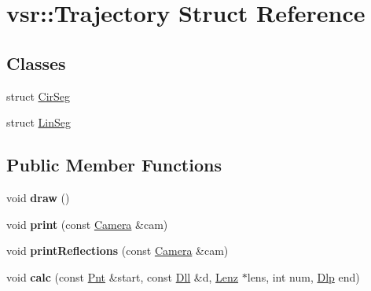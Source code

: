 \hypertarget{structvsr_1_1_trajectory}{\section{vsr\-:\-:Trajectory Struct Reference}
\label{structvsr_1_1_trajectory}
}
\subsection*{Classes}
\begin{DoxyCompactItemize}
\item 
struct \hyperlink{structvsr_1_1_trajectory_1_1_cir_seg}{Cir\-Seg}
\item 
struct \hyperlink{structvsr_1_1_trajectory_1_1_lin_seg}{Lin\-Seg}
\end{DoxyCompactItemize}
\subsection*{Public Member Functions}
\begin{DoxyCompactItemize}
\item 
\hypertarget{structvsr_1_1_trajectory_affe08065ef04802c2c675865188f8966}{void {\bfseries draw} ()}\label{structvsr_1_1_trajectory_affe08065ef04802c2c675865188f8966}

\item 
\hypertarget{structvsr_1_1_trajectory_aaa199c23f42797dd054612ab6236f297}{void {\bfseries print} (const \hyperlink{classvsr_1_1_camera}{Camera} \&cam)}\label{structvsr_1_1_trajectory_aaa199c23f42797dd054612ab6236f297}

\item 
\hypertarget{structvsr_1_1_trajectory_aff59cef53301d742ef40048882da41af}{void {\bfseries print\-Reflections} (const \hyperlink{classvsr_1_1_camera}{Camera} \&cam)}\label{structvsr_1_1_trajectory_aff59cef53301d742ef40048882da41af}

\item 
\hypertarget{structvsr_1_1_trajectory_a82c5f729f2708713f1df2ebad3288d38}{void {\bfseries calc} (const \hyperlink{namespacevsr_a2d05beb9721c5d9211b479af6d47222d}{Pnt} \&start, const \hyperlink{namespacevsr_a6c6892b7aec25cfb16492501e2e35b11}{Dll} \&d, \hyperlink{structvsr_1_1_lenz}{Lenz} $\ast$lens, int num, \hyperlink{namespacevsr_ae6aa665e2777c681cdc7cab893be07d2}{Dlp} end)}\label{structvsr_1_1_trajectory_a82c5f729f2708713f1df2ebad3288d38}

\end{DoxyCompactItemize}
